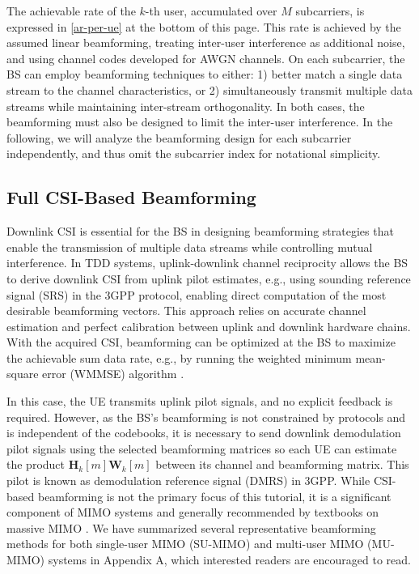 \documentclass[lettersize,journal]{IEEEtran}
\begin{document}
The achievable rate of the $k$-th user, accumulated over $M$ subcarriers, is expressed in \eqref{ar-per-ue} at the bottom of this page. This rate is achieved by the assumed linear beamforming, treating inter-user interference as additional noise, and using channel codes developed for AWGN channels.
On each subcarrier, the BS can employ beamforming techniques to either: 1) better match a single data stream to the channel characteristics, or 2) simultaneously transmit multiple data streams while maintaining inter-stream orthogonality. In both cases, the beamforming must also be designed to limit the inter-user interference.
In the following, we will analyze the beamforming design for each subcarrier independently, and thus omit the subcarrier index for notational simplicity. 


\subsection{Full CSI-Based Beamforming}

Downlink CSI is essential for the BS in designing beamforming strategies that enable the transmission of multiple data streams while controlling mutual interference.
In TDD systems, uplink-downlink channel reciprocity allows the BS to derive downlink CSI from uplink pilot estimates, e.g., using sounding reference signal (SRS) in the 3GPP protocol, enabling direct computation of the most desirable beamforming vectors. This approach relies on accurate channel estimation and perfect calibration between uplink and downlink hardware chains. With the acquired CSI, beamforming can be optimized at the BS to maximize the achievable sum data rate, e.g., by running the weighted minimum mean-square error (WMMSE) algorithm \cite{wmmse}. 

In this case, the UE transmits uplink pilot signals, and no explicit feedback is required. However, as the BS's beamforming is not constrained by protocols and is independent of the codebooks, it is necessary to send downlink demodulation pilot signals using the selected beamforming matrices so each UE can estimate the product $\mathbf{H}_k\left[m\right] \mathbf{W}_k\left[m\right]$ between its channel and beamforming matrix. This pilot is known as demodulation reference signal (DMRS) in 3GPP. While CSI-based beamforming is not the primary focus of this tutorial, it is a significant component of MIMO systems and generally recommended by textbooks on massive MIMO \cite{Marzetta2016a,massivemimobook}. We have summarized several representative beamforming methods for both single-user MIMO (SU-MIMO) and multi-user MIMO (MU-MIMO) systems in Appendix A, which interested readers are encouraged to read.
\end{document}
